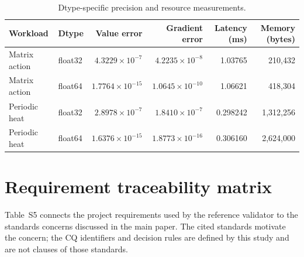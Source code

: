 \documentclass[preprint,12pt]{elsarticle}
\begin{document}
\begin{table}[htbp]
\centering
\caption{Dtype-specific precision and resource measurements.}
\label{tab:s4}
\scriptsize
\setlength{\tabcolsep}{3.5pt}
\begin{tabular}{@{}llrrrr@{}}
\toprule
Workload & Dtype & Value error & Gradient error & Latency (ms) & Memory (bytes)\\
\midrule
Matrix action & float32 & $4.3229\times10^{-7}$ & $4.2235\times10^{-8}$ & 1.03765 & 210,432\\
Matrix action & float64 & $1.7764\times10^{-15}$ & $1.0645\times10^{-10}$ & 1.06621 & 418,304\\
Periodic heat & float32 & $2.8978\times10^{-7}$ & $1.8410\times10^{-7}$ & 0.298242 & 1,312,256\\
Periodic heat & float64 & $1.6376\times10^{-15}$ & $1.8773\times10^{-16}$ & 0.306160 & 2,624,000\\
\bottomrule
\end{tabular}
\end{table}

\section{Requirement traceability matrix}
Table~S5 connects the project requirements used by the reference validator to the standards concerns discussed in the main paper. The cited standards motivate the concern; the CQ identifiers and decision rules are defined by this study and are not clauses of those standards.
\end{document}
